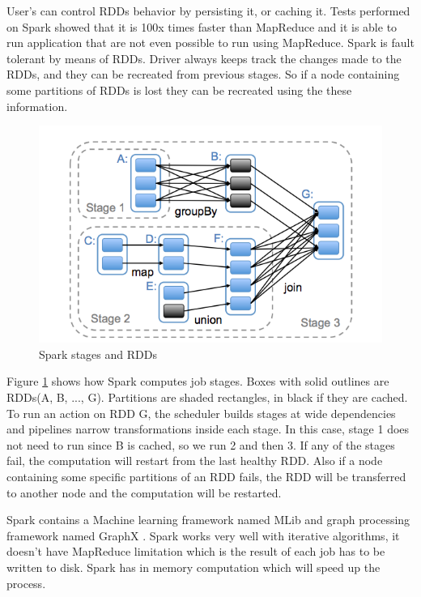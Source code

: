 \documentclass[english]{tktltiki}
\begin{document}
User's can control RDDs behavior by persisting it, or caching it. Tests performed on Spark showed that it is 100x times faster than MapReduce and it is able to run application that are not even possible to run using MapReduce. Spark is fault tolerant by means of RDDs. Driver always keeps track the changes made to the RDDs, and they can be recreated from previous stages. So if a node containing some partitions of RDDs is lost they can be recreated using the these information. 
 
\begin{figure}[ht!]
\centering
\includegraphics[width=130mm]{figures/rdd.png}
\caption{Spark stages and RDDs}
\label{fig:rdd}
\end{figure}
Figure \ref{fig:rdd} shows how Spark computes job stages. Boxes with solid outlines are RDDs(A, B, ..., G). Partitions are shaded rectangles, in black if they are cached. To run an action on RDD G, the scheduler builds stages at wide dependencies and pipelines narrow transformations inside each stage. In this case, stage 1 does not need to run since B is cached, so we run 2 and then 3. If any of the stages fail, the computation will restart from the last healthy RDD. Also if a node containing some specific partitions of an RDD fails, the RDD will be transferred to another node and the computation will be restarted. 

Spark contains a Machine learning framework named MLib and graph processing framework named GraphX . 
Spark works very well with iterative algorithms, it doesn't have MapReduce limitation which is the result of each job has to be written to disk. Spark has in memory computation which will speed up the process. 
\newpage
\end{document}
